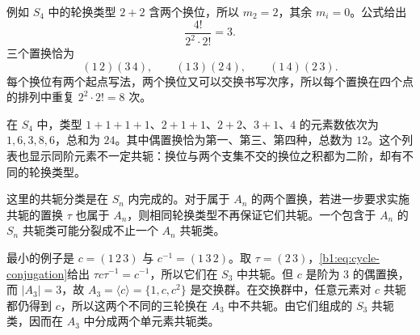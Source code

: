 例如 \(S_4\) 中的轮换类型 \(2+2\) 含两个换位，所以 \(m_2=2\)，其余 \(m_i=0\)。公式给出
\[
	\frac{4!}{2^2\cdot2!}=3.
\]
三个置换恰为
\[
	(1\,2)(3\,4),\qquad (1\,3)(2\,4),\qquad (1\,4)(2\,3).
\]
每个换位有两个起点写法，两个换位又可以交换书写次序，所以每个置换在四个点的排列中重复 \(2^2\cdot2!=8\) 次。

\ProseParagraphBreak
在 \(S_4\) 中，类型 \(1+1+1+1\)、\(2+1+1\)、\(2+2\)、\(3+1\)、\(4\) 的元素数依次为 \(1,6,3,8,6\)，总和为 \(24\)。其中偶置换恰为第一、第三、第四种，总数为 \(12\)。这个列表也显示同阶元素不一定共轭：换位与两个支集不交的换位之积都为二阶，却有不同的轮换类型。

\ProseParagraphBreak
这里的共轭分类是在 \(S_n\) 内完成的。对于属于 \(A_n\) 的两个置换，若进一步要求实施共轭的置换 \(\tau\) 也属于 \(A_n\)，则相同轮换类型不再保证它们共轭。一个包含于 \(A_n\) 的 \(S_n\) 共轭类可能分裂成不止一个 \(A_n\) 共轭类。

\ProseParagraphBreak
最小的例子是 \(c=(1\,2\,3)\) 与 \(c^{-1}=(1\,3\,2)\)。取 \(\tau=(2\,3)\)，\eqref{b1:eq:cycle-conjugation}给出 \(\tau c\tau^{-1}=c^{-1}\)，所以它们在 \(S_3\) 中共轭。但 \(c\) 是阶为 \(3\) 的偶置换，而 \(\lvert A_3\rvert=3\)，故 \(A_3=\langle c\rangle=\{1,c,c^2\}\) 是交换群。在交换群中，任意元素对 \(c\) 共轭都仍得到 \(c\)，所以这两个不同的三轮换在 \(A_3\) 中不共轭。由它们组成的 \(S_3\) 共轭类，因而在 \(A_3\) 中分成两个单元素共轭类。
